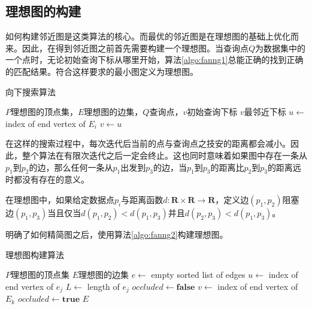 \subsection{理想图的构建}

如何构建邻近图是这类算法的核心。而最优的邻近图是在理想图的基础上优化而来。因此，在得到邻近图之前首先需要构建一个理想图。当查询点$Q$为数据集中的一个点时，无论初始查询下标从哪里开始，算法\ref{algo:fanng1}总能正确的找到正确的匹配结果。符合这样要求的最小图定义为理想图。

\begin{algorithm}
	\caption{向下搜索算法}
	\label{algo:fanng1}
	\begin{algorithmic}[1] %
		\Require $P$理想图的顶点集，$E$理想图的边集，$Q$查询点，$v$初始查询下标 %
		\Ensure $v$最邻近下标 %
		\State $u\leftarrow$ index of end vertex of $E_i$
		\State $v\leftarrow u$
		\EndIf
		\EndFor
	\end{algorithmic}
\end{algorithm}

在这样的搜索过程中，每次迭代后当前的点与查询点之技安的距离都会减小。因此，整个算法在有限次迭代之后一定会终止。这也同时意味着如果图中存在一条从$p_1$到$p_2$的边，那么任何一条从$p_1$出发到$p_3$的边，当$p_1$到$p_3$的距离比$p_2$到$p_3$的距离远时都没有存在的意义。

在理想图中，如果给定数据点$p_i$与距离函数$d:\mathbf{R}\times \mathbf{R} \rightarrow \mathbf{R}$，定义边$(p_1,p_2)$阻塞边$(p_1,p_3)$当且仅当$d(p_1,p_2)<d(p_1,p_3)$并且$d(p_2,p_3)<d(p_1,p_3)$。

明确了如何精简图之后，使用算法\ref{algo:fanng2}构建理想图。

\begin{algorithm}
	\caption{理想图构建算法}
	\label{algo:fanng2}
	\begin{algorithmic}[1] %
		\Require $P$理想图的顶点集
		\Ensure $E$理想图的边集 %
		\State $e\leftarrow$ empty sorted list of edges
		\State $u \leftarrow$ index of end vertex of $e_j$
		\State $L \leftarrow$ length of $e_j$
		\State $occluded \leftarrow \mathbf{false}$
		\State $v \leftarrow$ index of end vertex of $E_k$
		\State $occluded \leftarrow \mathbf{true}$
		\EndIf
		\EndFor
		\EndFor
		\EndFor
		\Return $E$
	\end{algorithmic}
\end{algorithm}

